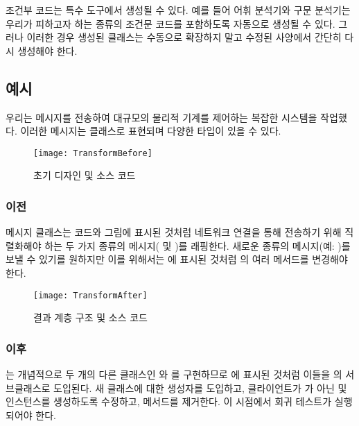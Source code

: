 \documentclass[a4paper,10pt,twoside]{book}
\begin{document}
\begin{bulletlist}
\item 조건부 코드는 특수 도구에서 생성될 수 있다. 예를 들어 어휘 분석기와 구문 분석기는 우리가 피하고자 하는 종류의 조건문 코드를 포함하도록 자동으로 생성될 수 있다. 그러나 이러한 경우 생성된 클래스는 수동으로 확장하지 말고 수정된 사양에서 간단히 다시 생성해야 한다.
\end{bulletlist}

\subsection*{예시}

우리는 메시지를 전송하여 대규모의 물리적 기계를 제어하는 복잡한 시스템을 작업했다. 이러한 메시지는  클래스로 표현되며 다양한 타입이 있을 수 있다.

\begin{figure}[h]
\begin{center}
\texttt{[image: TransformBefore]}
\caption{초기 디자인 및 소스 코드}
\end{center}
\end{figure}

\subsubsection*{이전}

메시지 클래스는 코드와 그림에 표시된 것처럼 네트워크 연결을 통해 전송하기 위해 직렬화해야 하는 두 가지 종류의 메시지( 및 )를 래핑한다. 새로운 종류의 메시지(예: )를 보낼 수 있기를 원하지만 이를 위해서는 에 표시된 것처럼 의 여러 메서드를 변경해야 한다. 

\begin{figure}[htb]
\begin{center}
\texttt{[image: TransformAfter]}
\caption{결과 계층 구조 및 소스 코드}
\end{center}
\end{figure}

\subsubsection*{이후}

는 개념적으로 두 개의 다른 클래스인 와 를 구현하므로 에 표시된 것처럼 이들을 의 서브클래스로 도입된다. 새 클래스에 대한 생성자를 도입하고, 클라이언트가 가 아닌  및  인스턴스를 생성하도록 수정하고,  메서드를 제거한다. 이 시점에서 회귀 테스트가 실행되어야 한다.
\end{document}
